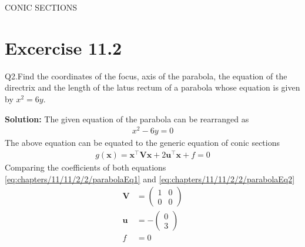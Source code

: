 \documentclass[12pt]{article}
\providecommand{\brak}[1]{\ensuremath{\left(#1\right)}}
\newcommand{\solution}{\noindent \textbf{Solution: }}
\newcommand{\myvec}[1]{\ensuremath{\begin{pmatrix}#1\end{pmatrix}}}
\let\vec\mathbf
\begin{document}
\begin{center}
\textbf\large{CONIC SECTIONS}

\end{center}
\section*{Excercise 11.2}

Q2.Find the coordinates of the focus, axis of the parabola, the equation of the directrix and the length of the latus rectum of a parabola whose equation is given by $x^2=6y$.

\solution
\fi
The given equation of the parabola can be rearranged as
\begin{align}
	\label{eq:chapters/11/11/2/2/parabolaEq1}
	x^2-6y=0
\end{align}
The above equation can be equated to the generic equation of conic sections
\begin{align}
	\label{eq:chapters/11/11/2/2/parabolaEq2}
	g\brak{\vec{x}}=\vec{x}^\top \vec{V}\vec{x}+2\vec{u}^\top \vec{x}+f=0
\end{align}
Comparing the coefficients of both equations \eqref{eq:chapters/11/11/2/2/parabolaEq1} and \eqref{eq:chapters/11/11/2/2/parabolaEq2}
\begin{align}
	\label{eq:chapters/11/11/2/2/eqV}
	\vec{V} &= \myvec{1&0\\0&0}\\
	\label{eq:chapters/11/11/2/2/eqU}
	\vec{u} &= -\myvec{0\\3}\\
	\label{eq:chapters/11/11/2/2/eqF}
	f &= 0
\end{align}
\end{document}
